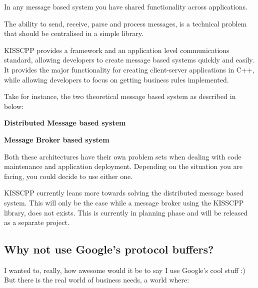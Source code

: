 In any message based system you have shared functionality across applications.

The ability to send, receive, parse and process messages, is a technical problem that should be centralised in a simple library.

K\-I\-S\-S\-C\-P\-P provides a framework and an application level communications standard, allowing developers to create message based systems quickly and easily. It provides the major functionality for creating client-\/server applications in C++, while allowing developers to focus on getting business rules implemented.

Take for instance, the two theoretical message based system as described in below\-:


\begin{DoxyEnumerate}
\item {\bfseries Distributed Message based system} 
\item {\bfseries Message Broker based system} 
\end{DoxyEnumerate}

Both these architectures have their own problem sets when dealing with code maintenance and application deployment. Depending on the situation you are facing, you could decide to use either one.

K\-I\-S\-S\-C\-P\-P currently leans more towards solving the distributed message based system. This will only be the case while a message broker using the K\-I\-S\-S\-C\-P\-P library, does not exists. This is currently in planning phase and will be released as a separate project.

\subsection*{Why not use Google's protocol buffers?}

I wanted to, really, how awesome would it be to say I use Google's cool stuff \-:) But there is the real world of business needs, a world where\-:


